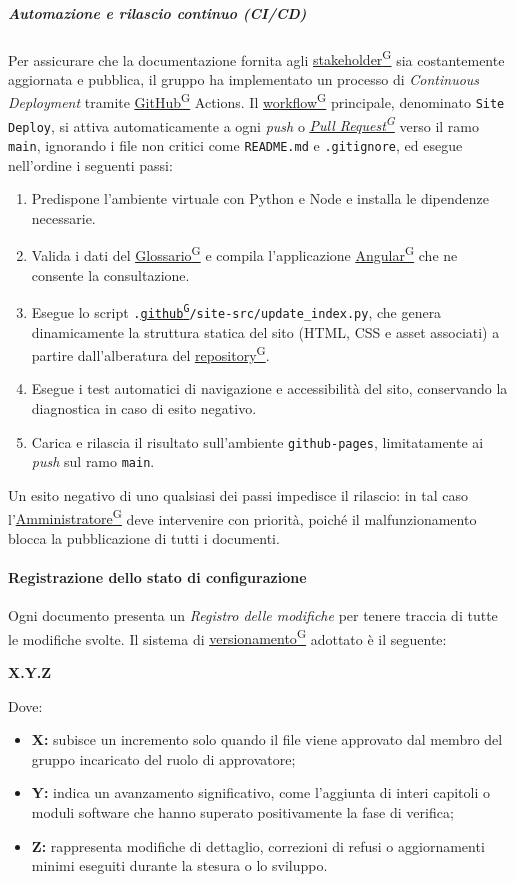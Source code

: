 \documentclass[a4paper,12pt]{article}
\providecommand{\glslink}[2]{\href{https://alittlebyte-19.github.io/Documentazione/glossario.html\#gls-#1}{\underline{#2}\textsuperscript{\scriptsize G}}}
\begin{document}
\subparagraph{Automazione e rilascio continuo (CI/CD)}
Per assicurare che la documentazione fornita agli \glslink{stakeholder}{stakeholder} sia costantemente aggiornata e pubblica, il gruppo ha implementato un processo di \textit{Continuous Deployment} tramite \glslink{github}{GitHub} Actions. Il \glslink{workflow}{workflow} principale, denominato \texttt{Site Deploy}, si attiva automaticamente a ogni \textit{push} o \textit{\glslink{pull-request}{Pull Request}} verso il ramo \texttt{main}, ignorando i file non critici come \texttt{README.md} e \texttt{.gitignore}, ed esegue nell'ordine i seguenti passi:

\begin{enumerate}
    \item Predispone l'ambiente virtuale con Python e Node e installa le dipendenze necessarie.
    \item Valida i dati del \glslink{glossario}{Glossario} e compila l'applicazione \glslink{angular}{Angular} che ne consente la consultazione.
    \item Esegue lo script \texttt{.\glslink{github}{github}/site-src/update\_index.py}, che genera dinamicamente la struttura statica del sito (HTML, CSS e asset associati) a partire dall'alberatura del \glslink{repository}{repository}.
    \item Esegue i test automatici di navigazione e accessibilità del sito, conservando la diagnostica in caso di esito negativo.
    \item Carica e rilascia il risultato sull'ambiente \texttt{github-pages}, limitatamente ai \textit{push} sul ramo \texttt{main}.
\end{enumerate}

Un esito negativo di uno qualsiasi dei passi impedisce il rilascio: in tal caso l'\glslink{amministratore}{Amministratore} deve intervenire con priorità, poiché il malfunzionamento blocca la pubblicazione di tutti i documenti.

\paragraph{Registrazione dello stato di configurazione}
Ogni documento presenta un \textit{Registro delle modifiche} per tenere traccia di tutte le modifiche svolte. Il sistema di \glslink{versioning}{versionamento} adottato è il seguente: \\

\centerline{\textbf{X.Y.Z}}

Dove:
\begin{itemize}
    \item \textbf{X:} subisce un incremento solo quando il file viene approvato dal membro del gruppo incaricato del ruolo di approvatore;
    \item \textbf{Y:} indica un avanzamento significativo, come l'aggiunta di interi capitoli o moduli software che hanno superato positivamente la fase di verifica;
    \item \textbf{Z:} rappresenta modifiche di dettaglio, correzioni di refusi o aggiornamenti minimi eseguiti durante la stesura o lo sviluppo.
\end{itemize}
\end{document}

